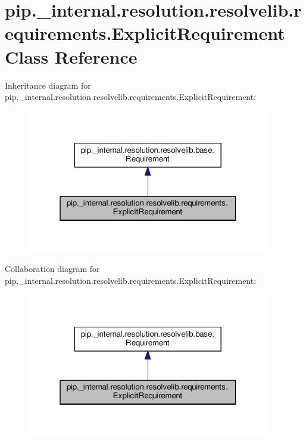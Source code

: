 \hypertarget{classpip_1_1__internal_1_1resolution_1_1resolvelib_1_1requirements_1_1ExplicitRequirement}{}\section{pip.\+\_\+internal.\+resolution.\+resolvelib.\+requirements.\+Explicit\+Requirement Class Reference}
\label{classpip_1_1__internal_1_1resolution_1_1resolvelib_1_1requirements_1_1ExplicitRequirement}


Inheritance diagram for pip.\+\_\+internal.\+resolution.\+resolvelib.\+requirements.\+Explicit\+Requirement\+:
\nopagebreak
\begin{figure}[H]
\begin{center}
\leavevmode
\includegraphics[width=301pt]{classpip_1_1__internal_1_1resolution_1_1resolvelib_1_1requirements_1_1ExplicitRequirement__inherit__graph}
\end{center}
\end{figure}


Collaboration diagram for pip.\+\_\+internal.\+resolution.\+resolvelib.\+requirements.\+Explicit\+Requirement\+:
\nopagebreak
\begin{figure}[H]
\begin{center}
\leavevmode
\includegraphics[width=301pt]{classpip_1_1__internal_1_1resolution_1_1resolvelib_1_1requirements_1_1ExplicitRequirement__coll__graph}
\end{center}
\end{figure}
